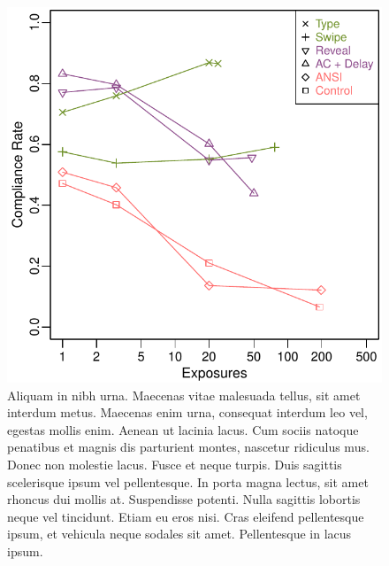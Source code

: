 \begin{figure}\centering
\includegraphics[scale=0.8]{chp-studytwo/images/fig-studytwo-results.pdf}
\caption[
	Aliquam in nibh urna. Maecenas vitae malesuada tellus, sit amet
	interdum metus.  Maecenas enim urna, consequat interdum leo vel,
	egestas mollis enim.
]{
	Aliquam in nibh urna. Maecenas vitae malesuada tellus, sit amet
	interdum metus.  Maecenas enim urna, consequat interdum leo vel,
	egestas mollis enim.  Aenean ut lacinia lacus.  Cum sociis natoque
	penatibus et magnis dis parturient montes, nascetur ridiculus mus. 
	Donec non molestie lacus.  Fusce et neque turpis.  Duis sagittis
	scelerisque ipsum vel pellentesque.  In porta magna lectus, sit amet
	rhoncus dui mollis at.  Suspendisse potenti.  Nulla sagittis lobortis
	neque vel tincidunt.  Etiam eu eros nisi.  Cras eleifend pellentesque
	ipsum, et vehicula neque sodales sit amet.  Pellentesque in lacus
	ipsum.
}
\label{fig:studytwo:results}
\end{figure}
